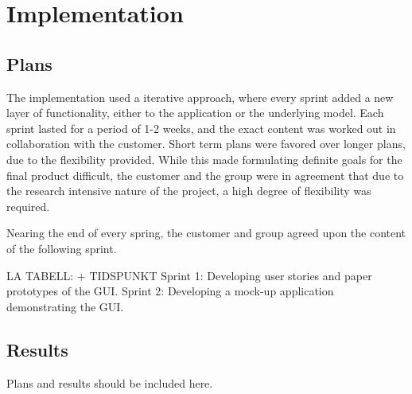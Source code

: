 \chapter{Implementation}
\section{Plans}

The implementation used a iterative approach, where every sprint added a new layer of functionality, either to the application or the underlying model. Each sprint lasted for a period of 1-2 weeks, and the exact content was worked out in collaboration with the customer. Short term plans were favored over longer plans, due to the flexibility provided. While this made formulating definite goals for the final product difficult, the customer and the group were in agreement that due to the research intensive nature of the project, a high degree of flexibility was required. 

Nearing the end of every spring, the customer and group agreed upon the content of the following sprint. 

LA TABELL: + TIDSPUNKT
Sprint 1: Developing user stories and paper prototypes of the GUI.
Sprint 2: Developing a mock-up application demonstrating the GUI.

\section{Results}
 Plans and results should be included here. 
